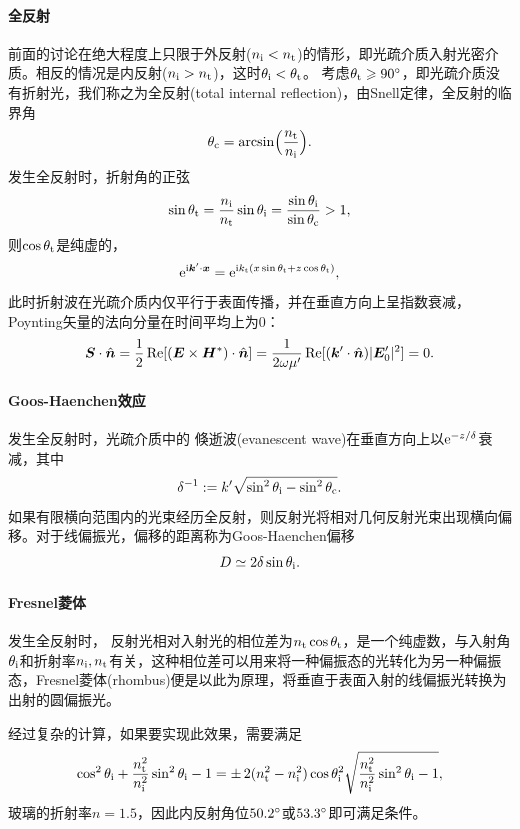 \paragraph{全反射}
前面的讨论在绝大程度上只限于外反射($n_{\mathrm{i}}<n_\text t$)的情形，即光疏介质入射光密介质。相反的情况是内反射($n_{\mathrm{i}}>n_\text t$)，这时$\theta_{\mathrm{i}}<\theta_\text t$。
考虑$\theta_\text t\geqslant90^\circ$，即光疏介质没有折射光，我们称之为全反射(total internal reflection)，由Snell定律，全反射的临界角
\begin{equation}
    \label{eqn:total reflect}
    \theta_\text c=\arcsin\Bigl(\frac{n_\text t}{n_{\mathrm{i}}}\Bigr).
\end{equation}
发生全反射时，折射角的正弦
\[
    \sin\theta_\text t=\frac{n_{\mathrm{i}}}{n_\text t}\sin\theta_{\mathrm{i}}=\frac{\sin\theta_{\mathrm{i}}}{\sin\theta_\text c}>1,
\]
则$\cos\theta_\text t$是纯虚的，
\[
    \mathop{}\!\mathrm{e}^{\mathrm{i}\bm k'\cdot\bm x}=\mathop{}\!\mathrm{e}^{\mathrm{i} k_\text t(x\sin\theta_\text t+z\cos\theta_\text t)},
\]
此时折射波在光疏介质内仅平行于表面传播，并在垂直方向上呈指数衰减，Poynting矢量的法向分量在时间平均上为0：
\[
    \bm S\cdot\mathop{}\!\hat{\bm n}=\frac12\operatorname{Re}[(\bm E\times\bm H^\ast)\cdot\mathop{}\!\hat{\bm n}]=\frac1{2\omega\mu'}\operatorname{Re}[(\bm k'\cdot\mathop{}\!\hat{\bm n})|\bm E'_0|^2]=0.
\]
\paragraph{Goos-Haenchen效应}
发生全反射时，光疏介质中的
倏逝波(evanescent wave)在垂直方向上以$\mathop{}\!\mathrm{e}^{-z/\delta}$衰减，其中
\[
    \delta^{-1}:=k'\sqrt{\sin^2\theta_{\mathrm{i}}-\sin^2\theta_\text c}.
\]
如果有限横向范围内的光束经历全反射，则反射光将相对几何反射光束出现横向偏移。对于线偏振光，偏移的距离称为Goos-Haenchen偏移
\[
    D\simeq 2\delta\sin\theta_{\mathrm{i}}.
\]
\paragraph{Fresnel菱体}
发生全反射时，
反射光相对入射光的相位差为$n_\text t\cos\theta_\text t$，是一个纯虚数，与入射角$\theta_{\mathrm{i}}$和折射率$n_{\mathrm{i}},n_\text t$有关，这种相位差可以用来将一种偏振态的光转化为另一种偏振态，Fresnel菱体(rhombus)便是以此为原理，将垂直于表面入射的线偏振光转换为出射的圆偏振光。

经过复杂的计算，如果要实现此效果，需要满足
\[
    \cos^2\theta_{\mathrm{i}}+\frac{n_\text t^2}{n_{\mathrm{i}}^2}\sin^2\theta_{\mathrm{i}}-1=\pm\,2(n_\text t^2-n_{\mathrm{i}}^2)\cos\theta_{\mathrm{i}}^2\sqrt{\frac{n_\text t^2}{n_{\mathrm{i}}^2}\sin^2\theta_{\mathrm{i}}-1},
\]
玻璃的折射率$n=1.5$，因此内反射角位$50.2^\circ$或$53.3^\circ$即可满足条件。

